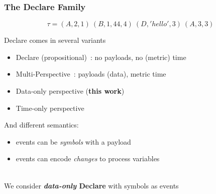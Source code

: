 \documentclass[xcolor=dvipsnames]{beamer}
\begin{document}
\begin{frame}
\frametitle{The Declare Family}

	$$\tau=(A,2,1)~(B,1,44,4)~(D,'hello',3)~(A,3,3)$$ 

Declare comes in several variants

\begin{itemize}
	\item Declare (propositional)~\cite{}: no payloads, no (metric) time
	\item Multi-Perspective~\cite{}: payloads (data), metric time
	\item Data-only perspective ({\bf this work})
	\item Time-only perspective
\end{itemize}

And different semantics:
\begin{itemize}
	\item events can be \emph{symbols} with a payload
	\item events can encode \emph{changes} to process variables
\end{itemize}

~\\

We consider {\bf \emph{data-only} Declare} with symbols as events

\end{frame}

\end{document}
